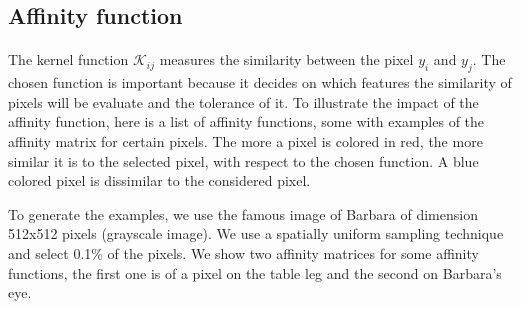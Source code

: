 \subsection{Affinity function}
\label{subsec:kernel-variations}

\paragraph{}
The kernel function \(\mathcal{K}_{ij}\) measures the similarity between the pixel \(y_i\) and \(y_j\).
The chosen function is important because it decides on which features the similarity of pixels will be evaluate and the tolerance of it.
To illustrate the impact of the affinity function, here is a list of affinity functions, some with examples of the affinity matrix for certain pixels.
The more a pixel is colored in red, the more similar it is to the selected pixel, with respect to the chosen function.
A blue colored pixel is dissimilar to the considered pixel.

To generate the examples, we use the famous image of Barbara of dimension 512x512 pixels (grayscale image).
We use a spatially uniform sampling technique and select 0.1\% of the pixels.
We show two affinity matrices for some affinity functions, the first one is of a pixel on the table leg and the second on Barbara's eye.

